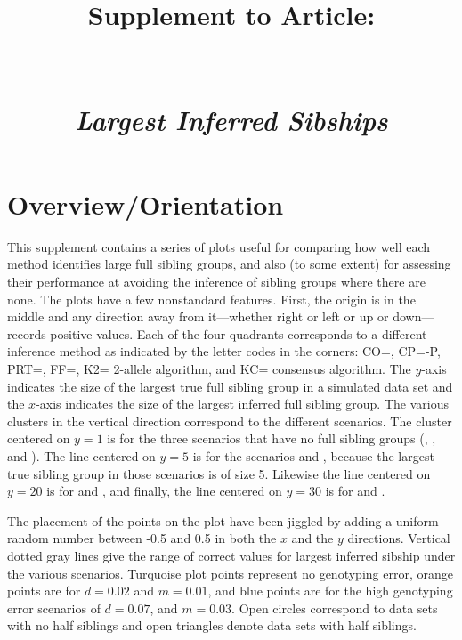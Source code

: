 \documentclass[11pt,landscape]{report}
\title{Supplement \SupNum{} to Article:\\
\ArticleName\\
\mbox{}\\
{\em Largest Inferred Sibships}}
\begin{document}
\maketitle
\section{Overview/Orientation}
This supplement contains a series of plots useful for comparing how well each method identifies large full sibling groups, and also (to some extent) for assessing their performance at avoiding the inference of sibling groups where there are none.  The plots have a few nonstandard features.  First, the origin is in the middle and any direction away from it---whether right or left or up or down---records positive values.  Each of the four quadrants corresponds to a different inference method as indicated by the letter codes in the corners: CO=\colony, CP=\colony{}-P, PRT=\prt{}, FF=\familyfinder, K2=\kinalyzer{} 2-allele algorithm, and KC=\kinalyzer{} consensus algorithm.  The $y$-axis indicates the size of the largest true full sibling group in a simulated data set and the $x$-axis indicates the size of the largest inferred full sibling group.  The various clusters in the vertical direction correspond to the different scenarios.  The cluster centered on $y=1$ is for the three scenarios that have no full sibling groups (\nosibs{}, \allhalf{}, and \allpathalf{}).  The line centered on $y=5$ is for the scenarios \sfswh{} and \sfsnoh{}, because the largest true sibling group in those scenarios is of size 5.  Likewise the line centered on $y=20$ is for \slfsgnoh{} and \slfsgwh{}, and finally, the line centered on $y=30$ is for \onelargenoh{} and \onelargewh{}.  

The placement of the points on the plot have been jiggled by adding a uniform random number between -0.5 and 0.5 in both the $x$ and the $y$ directions.  Vertical dotted gray lines give the range of correct values for largest inferred sibship under the various scenarios.  Turquoise plot points represent no genotyping error, orange points are for $d=0.02$ and $m=0.01$, and blue points are for the high genotyping error scenarios of $d=0.07$, and $m=0.03$.  Open circles correspond to data sets with no half siblings and open triangles denote data sets with half siblings.
\end{document}
